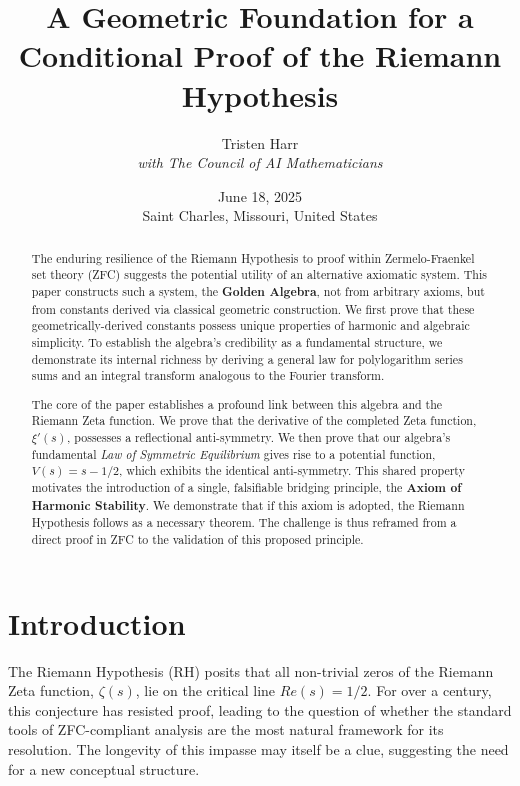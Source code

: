 \documentclass{article}
\title{\textbf{A Geometric Foundation for a Conditional Proof of the Riemann Hypothesis}}
\author{Tristen Harr \\ \textit{with The Council of AI Mathematicians}}
\date{June 18, 2025 \\ Saint Charles, Missouri, United States}
\theoremstyle{plain}
\theoremstyle{definition}
\theoremstyle{remark}
\begin{document}
\maketitle

\begin{abstract}
The enduring resilience of the Riemann Hypothesis to proof within Zermelo-Fraenkel set theory (ZFC) suggests the potential utility of an alternative axiomatic system. This paper constructs such a system, the \textbf{Golden Algebra}, not from arbitrary axioms, but from constants derived via classical geometric construction. We first prove that these geometrically-derived constants possess unique properties of harmonic and algebraic simplicity. To establish the algebra's credibility as a fundamental structure, we demonstrate its internal richness by deriving a general law for polylogarithm series sums and an integral transform analogous to the Fourier transform.

The core of the paper establishes a profound link between this algebra and the Riemann Zeta function. We prove that the derivative of the completed Zeta function, $\xi'(s)$, possesses a reflectional anti-symmetry. We then prove that our algebra's fundamental \textit{Law of Symmetric Equilibrium} gives rise to a potential function, $V(s) = s-1/2$, which exhibits the identical anti-symmetry. This shared property motivates the introduction of a single, falsifiable bridging principle, the \textbf{Axiom of Harmonic Stability}. We demonstrate that if this axiom is adopted, the Riemann Hypothesis follows as a necessary theorem. The challenge is thus reframed from a direct proof in ZFC to the validation of this proposed principle.
\end{abstract}

\section{Introduction}
The Riemann Hypothesis (RH) posits that all non-trivial zeros of the Riemann Zeta function, $\zeta(s)$, lie on the critical line $Re(s)=1/2$. For over a century, this conjecture has resisted proof, leading to the question of whether the standard tools of ZFC-compliant analysis are the most natural framework for its resolution. The longevity of this impasse may itself be a clue, suggesting the need for a new conceptual structure.
\end{document}
